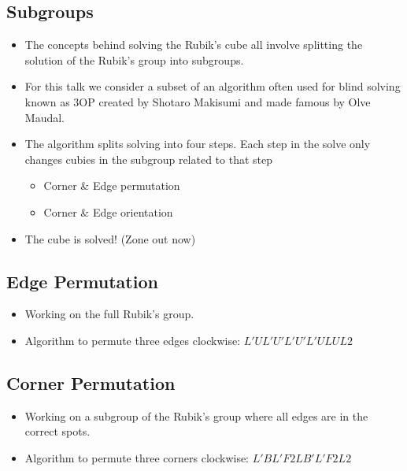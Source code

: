 \documentclass[xcolor=pdftex,dvipsnames,table]{beamer}
\begin{document}
\subsection{Subgroups}
\begin{frame}
  \begin{itemize}
    \item The concepts behind solving the Rubik's cube all involve splitting the solution of the Rubik's group into subgroups.
    \item For this talk we consider a subset of an algorithm often used for blind solving known as 3OP created by Shotaro Makisumi and made famous by Olve Maudal.
    \item The algorithm splits solving into four steps. Each step in the solve only changes cubies in the subgroup related to that step
      \begin{itemize}
      \item Corner \& Edge permutation
      \item Corner \& Edge orientation
      \end{itemize}
    \item The cube is solved! (Zone out now)
  \end{itemize}
\end{frame}

\subsection{Edge Permutation}
\begin{frame}
  \begin{itemize}
  \item Working on the full Rubik's group.
  \item Algorithm to permute three edges clockwise: $L' U L' U' L' U' L' U L U L2$
  \end{itemize}
\end{frame}

\subsection{Corner Permutation}
\begin{frame}
  \begin{itemize}
    \item Working on a subgroup of the Rubik's group where all edges are in the correct spots.
    \item Algorithm to permute three corners clockwise: $L' B L' F2 L B' L' F2 L2$
  \end{itemize}
\end{frame}
\end{document}

